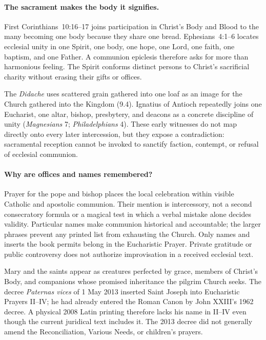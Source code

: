 \paragraph{The sacrament makes the body it signifies.}
First Corinthians~10:16--17 joins participation in Christ's Body and Blood to the many becoming one body because they share one bread. Ephesians~4:1--6 locates ecclesial unity in one Spirit, one body, one hope, one Lord, one faith, one baptism, and one Father. A communion epiclesis therefore asks for more than harmonious feeling. The Spirit conforms distinct persons to Christ's sacrificial charity without erasing their gifts or offices.

The \emph{Didache} uses scattered grain gathered into one loaf as an image for the Church gathered into the Kingdom (9.4). Ignatius of Antioch repeatedly joins one Eucharist, one altar, bishop, presbytery, and deacons as a concrete discipline of unity (\emph{Magnesians} 7; \emph{Philadelphians} 4). These early witnesses do not map directly onto every later intercession, but they expose a contradiction: sacramental reception cannot be invoked to sanctify faction, contempt, or refusal of ecclesial communion.

\paragraph{Why are offices and names remembered?}
Prayer for the pope and bishop places the local celebration within visible Catholic and apostolic communion. Their mention is intercessory, not a second consecratory formula or a magical test in which a verbal mistake alone decides validity. Particular names make communion historical and accountable; the larger phrases prevent any printed list from exhausting the Church. Only names and inserts the book permits belong in the Eucharistic Prayer. Private gratitude or public controversy does not authorize improvisation in a received ecclesial text.

Mary and the saints appear as creatures perfected by grace, members of Christ's Body, and companions whose promised inheritance the pilgrim Church seeks. The decree \emph{Paternas vices} of 1 May 2013 inserted Saint Joseph into Eucharistic Prayers II--IV; he had already entered the Roman Canon by John XXIII's 1962 decree. A physical 2008 Latin printing therefore lacks his name in II--IV even though the current juridical text includes it. The 2013 decree did not generally amend the Reconciliation, Various Needs, or children's prayers.

